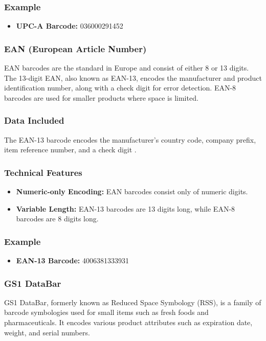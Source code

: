 \subsubsection{Example}
\begin{itemize}
	\item \textbf{UPC-A Barcode:} 036000291452
\end{itemize}

\subsubsection{EAN (European Article Number)}
EAN barcodes are the standard in Europe and consist of either 8 or 13 digits. The 13-digit EAN, also known as EAN-13, encodes the manufacturer and product identification number, along with a check digit for error detection. EAN-8 barcodes are used for smaller products where space is limited.

\subsubsection{Data Included}
The EAN-13 barcode encodes the manufacturer's country code, company prefix, item reference number, and a check digit \cite{ean_info}.

\subsubsection{Technical Features}
\begin{itemize}
	\item \textbf{Numeric-only Encoding:} EAN barcodes consist only of numeric digits.
	\item \textbf{Variable Length:} EAN-13 barcodes are 13 digits long, while EAN-8 barcodes are 8 digits long.
\end{itemize}

\subsubsection{Example}
\begin{itemize}
	\item \textbf{EAN-13 Barcode:} 4006381333931
\end{itemize}

\subsubsection{GS1 DataBar}
GS1 DataBar, formerly known as Reduced Space Symbology (RSS), is a family of barcode symbologies used for small items such as fresh foods and pharmaceuticals. It encodes various product attributes such as expiration date, weight, and serial numbers.

